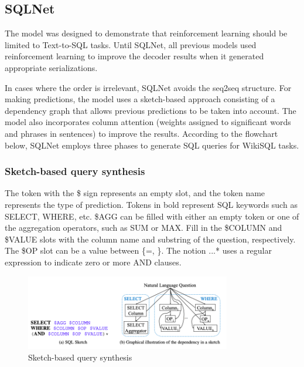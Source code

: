 \subsection{SQLNet} \label{sec:sqlnet}

The model was designed to demonstrate that reinforcement learning should be limited to Text-to-SQL tasks.
Until SQLNet\cite{xu_sqlnet_2017}, all previous models used reinforcement learning to improve the decoder results when it generated appropriate serializations.


In cases where the order is irrelevant, SQLNet avoids the seq2seq structure.
For making predictions, the model uses a sketch-based approach consisting of a dependency graph that allows previous predictions to be taken into account.
The model also incorporates column attention (weights assigned to significant words and phrases in sentences) to improve the results. According to the flowchart below, SQLNet employs three phases to generate SQL queries for WikiSQL tasks.


\subsubsection*{Sketch-based query synthesis}

The token with the \$ sign represents an empty slot, and the token name represents the type of prediction. Tokens in bold represent SQL keywords such as SELECT, WHERE, etc.
\$AGG can be filled with either an empty token or one of the aggregation operators, such as SUM or MAX. Fill in the \$COLUMN and \$VALUE slots with the column name and substring of the question, respectively. The \$OP slot can be a value between \{=, \}. The notion \(...\)* uses a regular expression to indicate zero or more AND clauses.

\begin{figure}[H]
    \centering
    \includegraphics[width=0.8\textwidth]{pics/sqlnet/sketch-based.png}
    \caption{Sketch-based query synthesis\cite{xu_sqlnet_2017}}
    \label{fig:sketch-based}
\end{figure}

